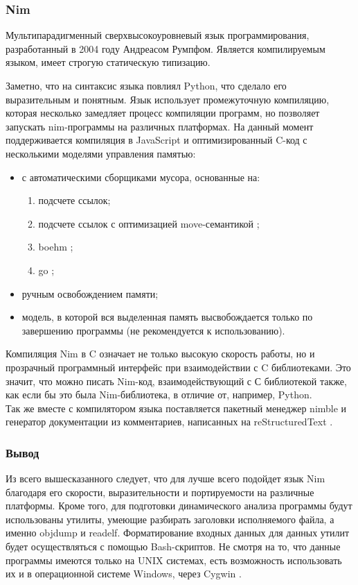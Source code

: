 \subsubsection{Nim}\label{sec:ch2/sec1/sub1/sub3}
Мультипарадигменный сверхвысокоуровневый 
язык программирования, разработанный в 2004 году Андреасом Румпфом.
Является компилируемым языком, имеет строгую статическую типизацию.

Заметно, что на синтаксис языка повлиял Python, что сделало его
выразительным и понятным. Язык использует промежуточную компиляцию, которая несколько
замедляет процесс компиляции программ, но позволяет запускать nim-программы на различных
платформах. На данный момент поддерживается компиляция в JavaScript \autocite{javascript}
и оптимизированный C-код с несколькими моделями управления памятью:\\
\begin{itemize}
    \item с автоматическими сборщиками мусора, основанные на:
        \begin{enumerate}[label={\arabic*)}]
            \item подсчете ссылок;
            \item подсчете ссылок с оптимизацией move-семантикой \autocite{nim-gc-move};
            \item boehm \autocite{boehm-gc};
            \item go \autocite{go-gc};
        \end{enumerate}
    \item ручным освобождением памяти;
    \item модель, в которой вся выделенная память высвобождается только по завершению программы
        (не рекомендуется к использованию).
\end{itemize}
Компиляция Nim в C означает не только высокую скорость работы, но и прозрачный программный интерфейс при взаимодействии с
C библиотеками. Это значит, что можно писать Nim-код, взаимодействующий с С библиотекой также, как
если бы это была Nim-библиотека, в отличие от, например, Python.\\
Так же вместе с компилятором языка поставляется пакетный менеджер nimble \autocite{nimble} и генератор
документации из комментариев, написанных на reStructuredText \autocite{restructuredtext}.

\subsubsection{Вывод}\label{sec:ch2/sec1/sub1/sub4}
Из всего вышесказанного следует, что для {\ProgModule} лучше всего подойдет язык Nim
благодаря его скорости, выразительности и портируемости на различные платформы.
Кроме того, для подготовки динамического анализа программы будут использованы утилиты, умеющие разбирать
заголовки исполняемого файла, а именно objdump и readelf. Форматирование входных данных для данных утилит
будет осуществляться с помощью Bash-скриптов. Не смотря на то, что данные программы имеются только на UNIX системах,
есть возможность использовать их и в операционной системе Windows, через Cygwin \autocite{cygwin}.

